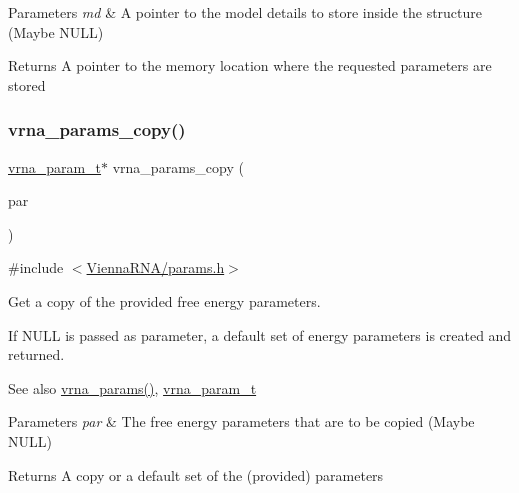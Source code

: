 \begin{DoxyParams}{Parameters}
{\em md} & A pointer to the model details to store inside the structure (Maybe N\+U\+LL) \\
\hline
\end{DoxyParams}
\begin{DoxyReturn}{Returns}
A pointer to the memory location where the requested parameters are stored 
\end{DoxyReturn}
\mbox{\label{group__energy__parameters_ga4bffa39f26e7746148444dd8a8426eca}} 
\subsubsection{\texorpdfstring{vrna\+\_\+params\+\_\+copy()}{vrna\_params\_copy()}}
{\footnotesize\ttfamily \mbox{\hyperlink{group__energy__parameters_ga8a69ca7d787e4fd6079914f5343a1f35}{vrna\+\_\+param\+\_\+t}}$\ast$ vrna\+\_\+params\+\_\+copy (\begin{DoxyParamCaption}\item[{\mbox{\hyperlink{group__energy__parameters_ga8a69ca7d787e4fd6079914f5343a1f35}{vrna\+\_\+param\+\_\+t}} $\ast$}]{par }\end{DoxyParamCaption})}



{\ttfamily \#include $<$\mbox{\hyperlink{params_8h}{Vienna\+R\+N\+A/params.\+h}}$>$}



Get a copy of the provided free energy parameters. 

If N\+U\+LL is passed as parameter, a default set of energy parameters is created and returned.

\begin{DoxySeeAlso}{See also}
\mbox{\hyperlink{group__energy__parameters_gad0e3e7e74bdc50d1709d40c92993185e}{vrna\+\_\+params()}}, \mbox{\hyperlink{group__energy__parameters_ga8a69ca7d787e4fd6079914f5343a1f35}{vrna\+\_\+param\+\_\+t}}
\end{DoxySeeAlso}

\begin{DoxyParams}{Parameters}
{\em par} & The free energy parameters that are to be copied (Maybe N\+U\+LL) \\
\hline
\end{DoxyParams}
\begin{DoxyReturn}{Returns}
A copy or a default set of the (provided) parameters 
\end{DoxyReturn}
\mbox{\label{group__energy__parameters_gab1f3016f96aa96bff020cdd904605afa}} 
